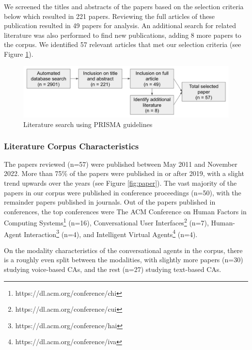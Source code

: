 \documentclass[sigconf,screen,review, anonymous]{acmart}
\begin{document}
We screened the titles and abstracts of the papers based on the selection criteria below which resulted in 221 papers. Reviewing the full articles of these publication resulted in 49 papers for analysis. An additional search for related literature was also performed to find new publications, adding 8 more papers to the corpus. We identified 57 relevant articles that met our selection criteria (see Figure \ref{fig:prisma}).

\begin{figure}[h]
  \centering
  \includegraphics[width=1\columnwidth]{fig-prisma.png}
  \caption{Literature search using PRISMA guidelines}
  \label{fig:prisma}
\end{figure}

\subsubsection*{Literature Corpus Characteristics}

The papers reviewed (n=57) were published between May 2011 and November 2022. More than 75\% of the papers were published in or after 2019, with a slight trend upwards over the years (see Figure \ref{fig:paper}). The vast majority of the papers in our corpus were published in conference proceedings (n=50), with the remainder papers published in journals. Out of the papers published in conferences, the top conferences were The ACM Conference on Human Factors in Computing Systems\footnote{https://dl.acm.org/conference/chi} (n=16), Conversational User Interfaces\footnote{https://dl.acm.org/conference/cui} (n=7), Human-Agent Interaction\footnote{https://dl.acm.org/conference/hai} (n=4), and Intelligent Virtual Agents\footnote{https://dl.acm.org/conference/iva} (n=4). 

On the modality characteristics of the conversational agents in the corpus, there is a roughly even split between the modalities, with slightly more papers (n=30) studying voice-based CAs, and the rest (n=27) studying text-based CAs.
\end{document}
